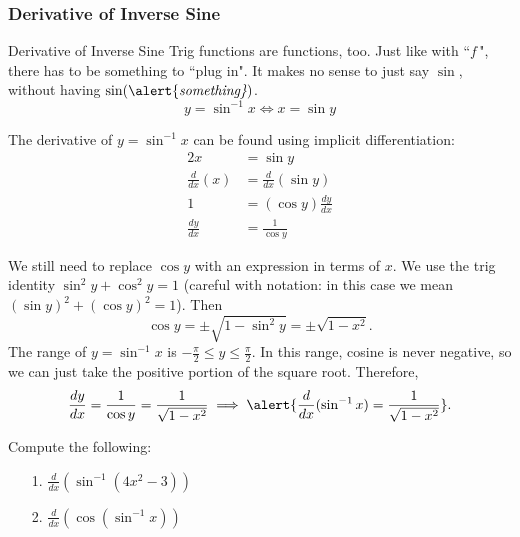 \documentclass[cal1spr16Lectures.tex]{subfiles}
\begin{document}
\subsubsection{Derivative of Inverse Sine}

\begin{frame}{\small Derivative of Inverse Sine}
Trig functions are functions, too.  Just like with ``$f\,$", there has to be something to ``plug in".  It makes no sense to just say $\sin$, without having $\sin(\text{\alert{\it something}})$.
\[y=\sin^{-1}x \Longleftrightarrow x=\sin y\]  
\end{frame}

\begin{frame}\footnotesize
The derivative of $y=\sin^{-1}x$ can be found using implicit differentiation: 
\begin{alignat*}{2}
x &= \sin y \\
\frac{d}{dx}(x) &= \frac{d}{dx}(\sin y) \\
1 &= (\cos y) \frac{dy}{dx} \\
\frac{dy}{dx} &= \frac{1}{\cos y}
\end{alignat*}
\end{frame}

\begin{frame}\footnotesize
We still need to replace $\cos y$ with an expression in terms of $x$.  We use the trig identity $\sin^2 y + \cos^2 y = 1$ (careful with notation: in this case we mean $\left(\sin y\right)^2+\left(\cos y\right)^2=1$).  Then 
\[\cos y= \pm \sqrt{1-\sin^2 y}=\pm\sqrt{1-x^2}.\]
The range of $y=\sin^{-1}x$ is $-\textstyle\frac{\pi}{2} \leq y \leq \frac{\pi}{2}$.  In this range, cosine is never negative, so we can just take the positive portion of the square root.
Therefore,
\[\frac{dy}{dx}=\frac{1}{\cos y}=\frac{1}{\sqrt{1-x^2}} \implies \alert{\frac{d}{dx}(\sin^{-1}x)=\frac{1}{\sqrt{1-x^2}}}.\]
\end{frame}

\begin{frame}{}
\begin{exe} Compute the following:
\begin{itemize}
\item[1.] $\frac{d}{dx} \left( \sin^{-1}(4x^2-3) \right)$
\item[2.] $\frac{d}{dx} \left( \cos(\sin^{-1}x) \right)$
\end{itemize}
\end{exe}
\end{frame}
\end{document}
